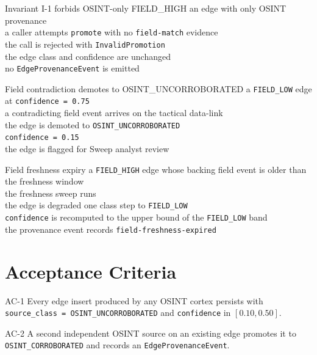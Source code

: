 \begin{scenario}{Invariant I-1 forbids OSINT-only FIELD\_HIGH}
\Given an edge with only OSINT provenance \\
\When a caller attempts \texttt{promote} with no \texttt{field-match} evidence \\
\Then the call is rejected with \texttt{InvalidPromotion} \\
\And the edge class and confidence are unchanged \\
\And no \texttt{EdgeProvenanceEvent} is emitted
\end{scenario}

\begin{scenario}{Field contradiction demotes to OSINT\_UNCORROBORATED}
\Given a \texttt{FIELD\_LOW} edge at \texttt{confidence = 0.75} \\
\When a contradicting field event arrives on the tactical data-link \\
\Then the edge is demoted to \texttt{OSINT\_UNCORROBORATED} \\
\And \texttt{confidence = 0.15} \\
\And the edge is flagged for Sweep analyst review
\end{scenario}

\begin{scenario}{Field freshness expiry}
\Given a \texttt{FIELD\_HIGH} edge whose backing field event is older than the freshness window \\
\When the freshness sweep runs \\
\Then the edge is degraded one class step to \texttt{FIELD\_LOW} \\
\And \texttt{confidence} is recomputed to the upper bound of the \texttt{FIELD\_LOW} band \\
\And the provenance event records \texttt{field-freshness-expired}
\end{scenario}

\section{Acceptance Criteria}

\begin{ac}{AC-1}
Every edge insert produced by any OSINT cortex persists with \texttt{source\_class = OSINT\_UNCORROBORATED} and \texttt{confidence} in $[0.10, 0.50]$.
\end{ac}

\begin{ac}{AC-2}
A second independent OSINT source on an existing edge promotes it to \texttt{OSINT\_CORROBORATED} and records an \texttt{EdgeProvenanceEvent}.
\end{ac}

